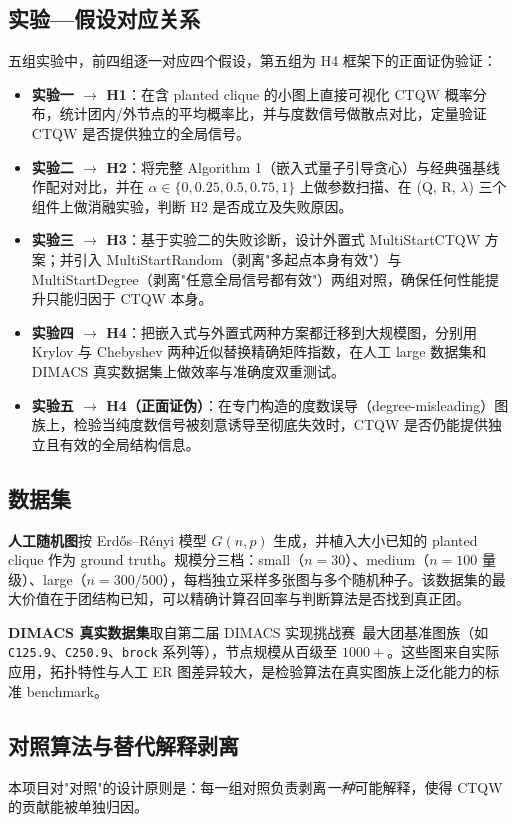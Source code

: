 \documentclass[pre,twocolumn]{revtex4-2}
\begin{document}
\subsection{实验—假设对应关系}
五组实验中，前四组逐一对应四个假设，第五组为 H4 框架下的正面证伪验证：
\begin{itemize}
\item \textbf{实验一 $\to$ H1}：在含 planted clique 的小图上直接可视化 CTQW 概率分布，统计团内/外节点的平均概率比，并与度数信号做散点对比，定量验证 CTQW 是否提供独立的全局信号。
\item \textbf{实验二 $\to$ H2}：将完整 Algorithm 1（嵌入式量子引导贪心）与经典强基线作配对对比，并在 $\alpha\in\{0,0.25,0.5,0.75,1\}$ 上做参数扫描、在 (Q, R, $\lambda$) 三个组件上做消融实验，判断 H2 是否成立及失败原因。
\item \textbf{实验三 $\to$ H3}：基于实验二的失败诊断，设计外置式 MultiStartCTQW 方案；并引入 MultiStartRandom（剥离"多起点本身有效"）与 MultiStartDegree（剥离"任意全局信号都有效"）两组对照，确保任何性能提升只能归因于 CTQW 本身。
\item \textbf{实验四 $\to$ H4}：把嵌入式与外置式两种方案都迁移到大规模图，分别用 Krylov 与 Chebyshev 两种近似替换精确矩阵指数，在人工 large 数据集和 DIMACS 真实数据集上做效率与准确度双重测试。
\item \textbf{实验五 $\to$ H4（正面证伪）}：在专门构造的度数误导（degree-misleading）图族上，检验当纯度数信号被刻意诱导至彻底失效时，CTQW 是否仍能提供独立且有效的全局结构信息。
\end{itemize}

\subsection{数据集}
\textbf{人工随机图}\quad 按 Erdős–Rényi 模型 $G(n,p)$ 生成，并植入大小已知的 planted clique 作为 ground truth。规模分三档：small（$n=30$）、medium（$n{=}100$ 量级）、large（$n=300/500$），每档独立采样多张图与多个随机种子。该数据集的最大价值在于团结构已知，可以精确计算召回率与判断算法是否找到真正团。

\textbf{DIMACS 真实数据集}\quad 取自第二届 DIMACS 实现挑战赛~\cite{dimacs1996}最大团基准图族（如 \texttt{C125.9}、\texttt{C250.9}、\texttt{brock} 系列等），节点规模从百级至 $1000+$。这些图来自实际应用，拓扑特性与人工 ER 图差异较大，是检验算法在真实图族上泛化能力的标准 benchmark。

\subsection{对照算法与替代解释剥离}
本项目对"对照"的设计原则是：每一组对照负责剥离\emph{一种}可能解释，使得 CTQW 的贡献能被单独归因。
\end{document}
